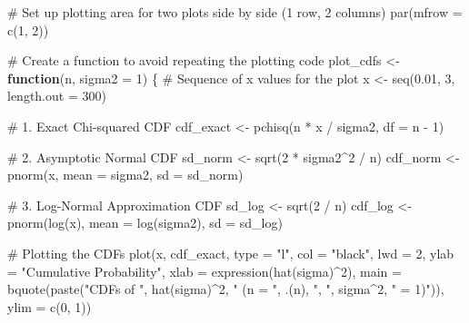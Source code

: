 \documentclass[
  letterpaper,
  DIV=11,
  numbers=noendperiod]{scrreprt}
\newenvironment{Shaded}{\begin{snugshade}}{\end{snugshade}}
\newcommand{\AttributeTok}[1]{\textcolor[rgb]{0.40,0.45,0.13}{#1}}
\newcommand{\CommentTok}[1]{\textcolor[rgb]{0.37,0.37,0.37}{#1}}
\newcommand{\ControlFlowTok}[1]{\textcolor[rgb]{0.00,0.23,0.31}{\textbf{#1}}}
\newcommand{\DecValTok}[1]{\textcolor[rgb]{0.68,0.00,0.00}{#1}}
\newcommand{\FloatTok}[1]{\textcolor[rgb]{0.68,0.00,0.00}{#1}}
\newcommand{\FunctionTok}[1]{\textcolor[rgb]{0.28,0.35,0.67}{#1}}
\newcommand{\NormalTok}[1]{\textcolor[rgb]{0.00,0.23,0.31}{#1}}
\newcommand{\OtherTok}[1]{\textcolor[rgb]{0.00,0.23,0.31}{#1}}
\newcommand{\SpecialCharTok}[1]{\textcolor[rgb]{0.37,0.37,0.37}{#1}}
\newcommand{\StringTok}[1]{\textcolor[rgb]{0.13,0.47,0.30}{#1}}
\renewcommand{\[}{\begin{equation}}
\renewcommand{\]}{\end{equation}}
\theoremstyle{definition}
\theoremstyle{plain}
\theoremstyle{plain}
\theoremstyle{plain}
\theoremstyle{definition}
\theoremstyle{plain}
\theoremstyle{remark}
\begin{document}
\begin{Shaded}
\begin{Highlighting}[]
\CommentTok{\# Set up plotting area for two plots side by side (1 row, 2 columns)}
\FunctionTok{par}\NormalTok{(}\AttributeTok{mfrow =} \FunctionTok{c}\NormalTok{(}\DecValTok{1}\NormalTok{, }\DecValTok{2}\NormalTok{))}

\CommentTok{\# Create a function to avoid repeating the plotting code}
\NormalTok{plot\_cdfs }\OtherTok{\textless{}{-}} \ControlFlowTok{function}\NormalTok{(n, }\AttributeTok{sigma2 =} \DecValTok{1}\NormalTok{) \{}
  \CommentTok{\# Sequence of x values for the plot}
\NormalTok{  x }\OtherTok{\textless{}{-}} \FunctionTok{seq}\NormalTok{(}\FloatTok{0.01}\NormalTok{, }\DecValTok{3}\NormalTok{, }\AttributeTok{length.out =} \DecValTok{300}\NormalTok{)}
  
  \CommentTok{\# 1. Exact Chi{-}squared CDF}
\NormalTok{  cdf\_exact }\OtherTok{\textless{}{-}} \FunctionTok{pchisq}\NormalTok{(n }\SpecialCharTok{*}\NormalTok{ x }\SpecialCharTok{/}\NormalTok{ sigma2, }\AttributeTok{df =}\NormalTok{ n }\SpecialCharTok{{-}} \DecValTok{1}\NormalTok{)}
  
  \CommentTok{\# 2. Asymptotic Normal CDF}
\NormalTok{  sd\_norm }\OtherTok{\textless{}{-}} \FunctionTok{sqrt}\NormalTok{(}\DecValTok{2} \SpecialCharTok{*}\NormalTok{ sigma2}\SpecialCharTok{\^{}}\DecValTok{2} \SpecialCharTok{/}\NormalTok{ n)}
\NormalTok{  cdf\_norm }\OtherTok{\textless{}{-}} \FunctionTok{pnorm}\NormalTok{(x, }\AttributeTok{mean =}\NormalTok{ sigma2, }\AttributeTok{sd =}\NormalTok{ sd\_norm)}
  
  \CommentTok{\# 3. Log{-}Normal Approximation CDF}
\NormalTok{  sd\_log }\OtherTok{\textless{}{-}} \FunctionTok{sqrt}\NormalTok{(}\DecValTok{2} \SpecialCharTok{/}\NormalTok{ n)}
\NormalTok{  cdf\_log }\OtherTok{\textless{}{-}} \FunctionTok{pnorm}\NormalTok{(}\FunctionTok{log}\NormalTok{(x), }\AttributeTok{mean =} \FunctionTok{log}\NormalTok{(sigma2), }\AttributeTok{sd =}\NormalTok{ sd\_log)}
  
  \CommentTok{\# Plotting the CDFs}
  \FunctionTok{plot}\NormalTok{(x, cdf\_exact, }\AttributeTok{type =} \StringTok{"l"}\NormalTok{, }\AttributeTok{col =} \StringTok{"black"}\NormalTok{, }\AttributeTok{lwd =} \DecValTok{2}\NormalTok{,}
       \AttributeTok{ylab =} \StringTok{"Cumulative Probability"}\NormalTok{, }
       \AttributeTok{xlab =} \FunctionTok{expression}\NormalTok{(}\FunctionTok{hat}\NormalTok{(sigma)}\SpecialCharTok{\^{}}\DecValTok{2}\NormalTok{),}
       \AttributeTok{main =} \FunctionTok{bquote}\NormalTok{(}\FunctionTok{paste}\NormalTok{(}\StringTok{"CDFs of "}\NormalTok{, }\FunctionTok{hat}\NormalTok{(sigma)}\SpecialCharTok{\^{}}\DecValTok{2}\NormalTok{, }\StringTok{" (n = "}\NormalTok{, .(n), }\StringTok{", "}\NormalTok{, sigma}\SpecialCharTok{\^{}}\DecValTok{2}\NormalTok{, }\StringTok{" = 1)"}\NormalTok{)),}
       \AttributeTok{ylim =} \FunctionTok{c}\NormalTok{(}\DecValTok{0}\NormalTok{, }\DecValTok{1}\NormalTok{))}
  

\end{Highlighting}
\end{Shaded}
\end{document}
